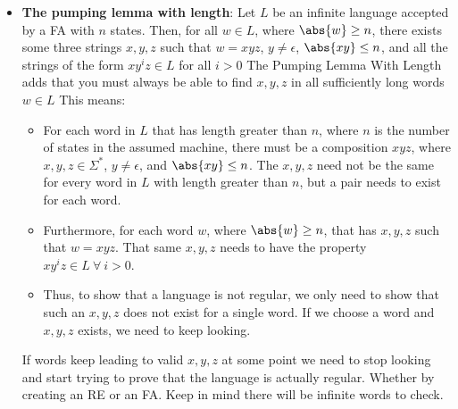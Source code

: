 \documentclass{report}
\begin{document}
\begin{itemize}
\item \textbf{The pumping lemma with length}:
    Let $L$ be an infinite language accepted by a FA with $n$ states. Then, for all $w\in L$, where $\abs{w} \geq n$, there exists some three strings $x,y,z$ such that $w=xyz$, $y\ne \epsilon$, $\abs{xy} \leq n$, and all the strings of the form $xy^{i}z \in L$ for all $i>0$
    \bigbreak \noindent 
    The Pumping Lemma With Length adds that you must always be able to find $x,y,z$ in all sufficiently long words $w\in L$
    This means:
    \begin{itemize}
        \item For each word in $L$ that has length greater than $n$, where $n$ is the number of states in the assumed machine, there must be a composition $xyz$, where $x,y,z \in \Sigma^{*}$, $y\ne \epsilon$, and $\abs{xy} \leq n$. The $x,y,z$ need not be the same for every  word in $L$ with length greater than $n$, but a pair needs to exist for each word.
        \item Furthermore, for each word $w$, where $\abs{w} \geq n$, that has $x,y,z$ such that $w = xyz$. That same $x,y,z$ needs to have the property $xy^{i}z \in L \ \forall\ i>0$.
        \item Thus, to show that a language is not regular, we only need to show that such an $x,y,z$ does not exist for a single word. If we choose a word and $x,y,z$ exists, we need to keep looking.
    \end{itemize}
    If words keep leading to valid $x,y,z$ at some point we need to stop looking and start trying to prove that the language is actually regular. Whether by creating an RE or an FA. Keep in mind there will be infinite words to check.
    \end{itemize}

    \pagebreak 
\end{document}
